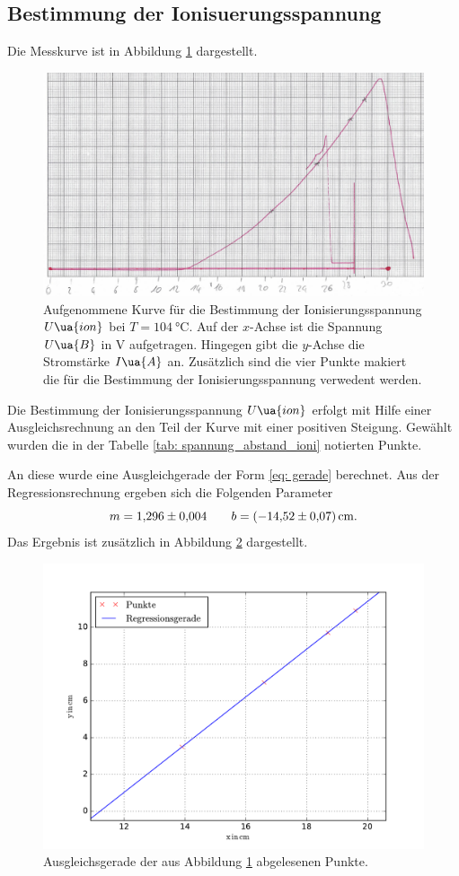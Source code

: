 \subsection{Bestimmung der Ionisuerungsspannung}
\FloatBarrier
Die Messkurve ist in Abbildung \ref{fig: messkurve_ioni} dargestellt.
\begin{figure}
  \centering
  \includegraphics[width=0.8 \textwidth]{./pics/ionisierungsenergie.png}
  \caption{Aufgenommene Kurve für die Bestimmung der Ionisierungsspannung $U\ua{ion}$ bei $T=\SI{104}{\celsius}$. Auf der $x$-Achse ist die Spannung $U\ua{B}$ in $\si{\volt}$ aufgetragen.
          Hingegen gibt die $y$-Achse die Stromstärke $I\ua{A}$ an. Zusätzlich sind die vier Punkte makiert die für die Bestimmung der Ionisierungsspannung verwedent werden.}
  \label{fig: messkurve_ioni}
\end{figure}
Die Bestimmung der Ionisierungsspannung $U\ua{ion}$ erfolgt mit Hilfe einer Ausgleichsrechnung an den Teil der Kurve mit einer positiven Steigung.
Gewählt wurden die in der Tabelle \ref{tab: spannung_abstand_ioni} notierten Punkte.

An diese wurde eine Ausgleichgerade der Form \eqref{eq: gerade} berechnet.
Aus der Regressionsrechnung ergeben sich die Folgenden Parameter
\begin{equation*}
  m=\num{1.296\pm0.004} \qquad b=\SI{-14.52\pm0.07}{\centi\meter}.
\end{equation*}
Das Ergebnis ist zusätzlich in Abbildung \ref{fig: ioni_fit} dargestellt.
\begin{figure}
  \centering
  \includegraphics[width=0.8 \textwidth]{../Messdaten/gerade_io_final.pdf}
  \caption{Ausgleichsgerade der aus Abbildung \ref{fig: messkurve_ioni} abgelesenen Punkte.}
  \label{fig: ioni_fit}
\end{figure}
